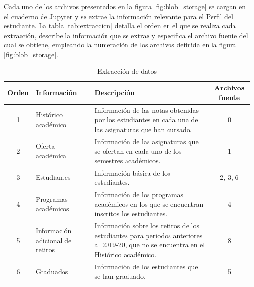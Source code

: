 Cada uno de los archivos presentados en la figura \ref{fig:blob_storage} se cargan en el cuaderno de Jupyter y se extrae la información relevante para el Perfil del estudiante. La tabla \ref{tab:extraccion} detalla el orden en el que se realiza cada extracción, describe la información que se extrae y especifica el archivo fuente del cual se obtiene, empleando la numeración de los archivos definida en la figura \ref{fig:blob_storage}.

\begin{table}[h]
	\centering
	\caption{Extracción de datos}
	\alternatecolors
	\begin{tabular}{cp{2.3cm}p{7cm}c}
		\hline
		\textbf{Orden} & \textbf{Información}                               & \textbf{Descripción}                                                                                                                 & \textbf{Archivos fuente} \\
		\hline
		1              & Histórico académico                                & Información de las notas obtenidas por los estudiantes en cada una de las asignaturas que han cursado.                               & 0                        \\
		2              & Oferta \newline académica                          & Información de las asignaturas que se ofertan en cada uno de los semestres académicos.                                               & 1                        \\
		3              & Estudiantes                                        & Información básica de los estudiantes.                                                                                               & 2, 3, 6                  \\
		4              & Programas académicos                               & Información de los programas académicos en los que se encuentran inscritos los estudiantes.                                          & 4                        \\
		5              & Información \newline adicional \newline de retiros & Información sobre los retiros de los estudiantes para periodos anteriores al 2019-20, que no se encuentra en el Histórico académico. & 8                        \\
		6              & Graduados                                          & Información de los estudiantes que se han graduado.                                                                                  & 5                        \\

\end{tabular}
\end{table}
